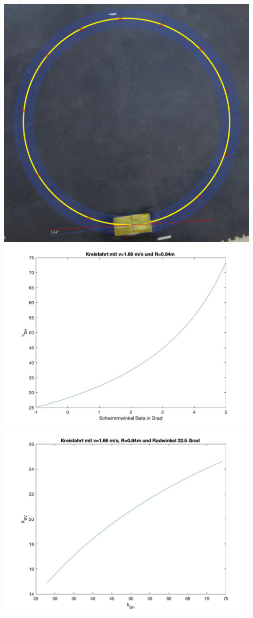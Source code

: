 \begin{center}
\includegraphics[scale=0.2]{Figures/Schwimmwinkel.png}\\

\includegraphics[scale=0.3]{Figures/ksh(beta).jpg}\\

\includegraphics[scale=0.3]{Figures/ksv(ksv).jpg}
\end{center}
